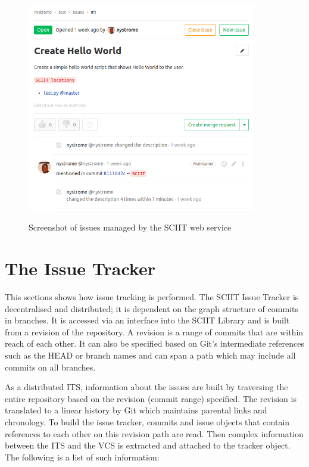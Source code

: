 \documentclass{mproj}
\begin{document}
\begin{figure}[t]
\centering
  \caption{Screenshot of issues managed by the SCIIT web service}
  \includegraphics[width=10cm]{sciit-gitlab-shot}
  \label{fig:sciit-gitlab-shot}
\end{figure}


\section{The Issue Tracker}

This sections shows how issue tracking is performed. The SCIIT Issue Tracker is decentralised and distributed; it is dependent on the graph structure of commits in branches. It is accessed via an interface into the SCIIT Library and is built from a revision of the repository. A revision is a range of commits that are within reach of each other. It can also be specified based on Git’s intermediate references such as the HEAD or branch names and can span a path which may include all commits on all branches.

As a distributed ITS, information about the issues are built by traversing the entire repository based on the revision (commit range) specified. The revision is translated to a linear history by Git which maintains parental links and chronology. To build the issue tracker, commits and issue objects that contain references to each other on this revision path are read. Then complex information between the ITS and the VCS is extracted and attached to the tracker object. The following is a list of such information:
\end{document}
